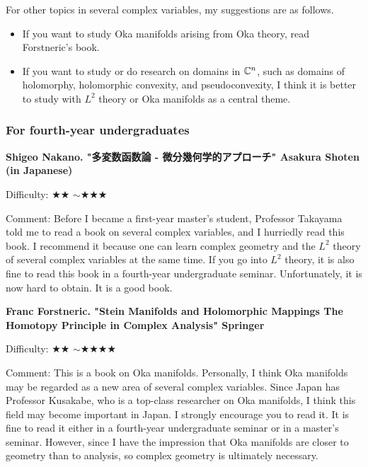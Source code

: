 For other topics in several complex variables, my suggestions are as follows.
\vspace{-8pt}
\begin{tcolorbox}[mybox]
\begin{itemize}[left=0pt]
  \setlength{\parskip}{0cm} %
  \setlength{\itemsep}{5pt} %
\item If you want to study Oka manifolds arising from Oka theory, read Forstneric's book.
\item If you want to study or do research on domains in $\mathbb{C}^n$, such as domains of holomorphy, holomorphic convexity, and pseudoconvexity, I think it is better to study with $L^2$ theory or Oka manifolds as a central theme.
\end{itemize}
\end{tcolorbox}

\subsubsection{For fourth-year undergraduates}

\textbf{Shigeo Nakano. "多変数函数論 - 微分幾何学的アプローチ" Asakura Shoten  (in Japanese)}  　\vspace{-6pt} 

Difficulty: ★★ $\sim$★★★ 　\vspace{-6pt} 

Comment: Before I became a first-year master's student, Professor Takayama told me to read a book on several complex variables, and I hurriedly read this book. I recommend it because one can learn complex geometry and the $L^2$ theory of several complex variables at the same time. If you go into $L^2$ theory, it is also fine to read this book in a fourth-year undergraduate seminar. Unfortunately, it is now hard to obtain. It is a good book.

\vspace{8pt}

\textbf{Franc Forstneric. "Stein Manifolds and Holomorphic Mappings
The Homotopy Principle in Complex Analysis" Springer}   \vspace{-6pt} 

Difficulty: ★★ $\sim$★★★★ \vspace{-6pt} 

Comment: This is a book on Oka manifolds. Personally, I think Oka manifolds may be regarded as a new area of several complex variables. 
Since Japan has Professor Kusakabe, who is a top-class researcher on Oka manifolds, I think this field may become important in Japan.
I strongly encourage you to read it. It is fine to read it either in a fourth-year undergraduate seminar or in a master's seminar. 
However, since I have the impression that Oka manifolds are closer to geometry than to analysis, so complex geometry is ultimately necessary.

